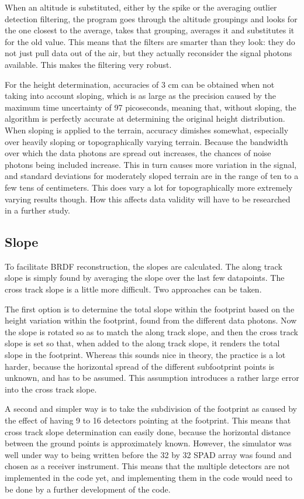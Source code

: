 When an altitude is substituted, either by the spike or the averaging outlier detection filtering, the program goes through the altitude groupings and looks for the one closest to the average, takes that grouping, averages it and substitutes it for the old value. This means that the filters are smarter than they look: they do not just pull data out of the air, but they actually reconsider the signal photons available. This makes the filtering very robust.

For the height determination, accuracies of 3 cm can be obtained when not taking into account sloping, which is as large as the precision caused by the maximum time uncertainty of 97 picoseconds, meaning that, without sloping, the algorithm is perfectly accurate at determining the original height distribution. When sloping is applied to the terrain, accuracy dimishes somewhat, especially over heavily sloping or topographically varying terrain. Because the bandwidth over which the data photons are spread out increases, the chances of noise photons being included increase. This in turn causes more variation in the signal, and standard deviations for moderately sloped terrain are in the range of ten to a few tens of centimeters. This does vary a lot for topographically more extremely varying results though. How this affects data validity will have to be researched in a further study.

\subsection{Slope}
\label{sec:Slope}
To facilitate \ac{BRDF} reconstruction, the slopes are calculated. The along track slope is simply found by averaging the slope over the last few datapoints. The cross track slope is a little more difficult. Two approaches can be taken. 

The first option is to determine the total slope within the footprint based on the height variation within the footprint, found from the different data photons. Now the slope is rotated so as to match the along track slope, and then the cross track slope is set so that, when added to the along track slope, it renders the total slope in the footprint. Whereas this sounds nice in theory, the practice is a lot harder, because the horizontal spread of the different subfootprint points is unknown, and has to be assumed. This assumption introduces a rather large error into the cross track slope.

A second and simpler way is to take the subdivision of the footprint as caused by the effect of having 9 to 16 detectors pointing at the footprint. This means that cross track slope determination can easily done, because the horizontal distance between the ground points is approximately known. However, the simulator was well under way to being written before the 32 by 32 \ac{SPAD} array was found and chosen as a receiver instrument. This means that the multiple detectors are not implemented in the code yet, and implementing them in the code would need to be done by a further development of the code.

